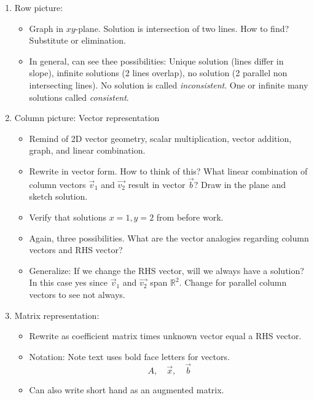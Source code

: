 \documentclass{article}
\begin{document}
\begin{enumerate}
\begin{enumerate}
\item Row picture: 
\begin{itemize}
\item Graph in $xy$-plane. Solution is intersection of two lines. How to find? Substitute or elimination.

\item In general, can see thee possibilities: Unique solution (lines differ in slope), infinite solutions (2 lines overlap), no solution (2 parallel non intersecting lines). No solution is called \emph{inconsistent}. One or infinite many solutions called \emph{consistent}.
\end{itemize}

\item Column picture: Vector representation
\begin{itemize}
\item Remind of 2D vector geometry, scalar multiplication, vector addition, graph, and linear combination. 

\item Rewrite in vector form. How to think of this? What linear combination of column vectors $\vec{v}_1$ and $\vec{v_2}$ result in vector $\vec{b}$? Draw in the plane and sketch solution. 

\item Verify that solutions $x=1, y=2$ from before work.

\item Again, three possibilities. What are the vector analogies regarding column vectors and RHS vector?

\item Generalize: If we change the RHS vector, will we always have a solution? In this case yes since $\vec{v}_1$ and $\vec{v_2}$ span $\mathbb{R}^2$. Change for parallel column vectors to see not always. 
\end{itemize}

\item Matrix representation: 
\begin{itemize}
\item Rewrite as coefficient matrix times unknown vector equal a RHS vector. 

\item Notation: Note text uses bold face letters for vectors.
\[
A, \quad \vec{x}, \quad \vec{b}
\]

\item Can also write short hand as an augmented matrix.


\end{itemize}
\end{enumerate}
\end{enumerate}
\end{document}
